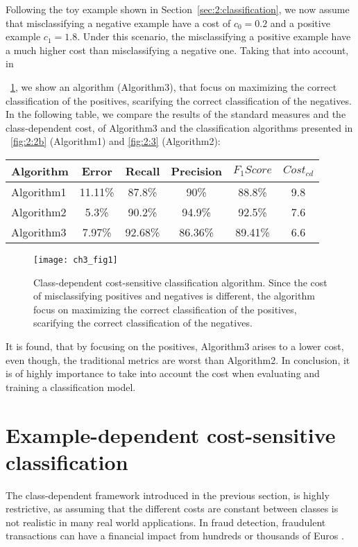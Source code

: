 Following the toy example shown in Section~\ref{sec:2:classification}, we now assume that 
misclassifying a negative example have a cost of $c_0=0.2$ and a positive example $c_1=1.8$. 
Under this scenario, the misclassifying a positive example have a much higher cost than 
misclassifying a negative one. Taking that into account, in \figurename{~\ref{fig:3:1}, we show an 
algorithm (Algorithm3), that focus on maximizing the correct classification of the positives, 
scarifying the correct classification of the negatives. In the following table, we compare the 
results of the standard measures and the class-dependent cost, of Algorithm3 and the classification 
algorithms presented in \figurename{~\ref{fig:2:2b}} (Algorithm1) and \figurename{ \ref{fig:2:3}} 
(Algorithm2):
\begin{center}
    \footnotesize
  \begin{tabular}{l|c|c|c|c|c}
  Algorithm & Error & Recall & Precision & $F_1Score$ & $Cost_{cd}$ \\
  \hline
  Algorithm1 & 11.11\% & 87.8\%& 90\%& 88.8\% & 9.8\\ %
  Algorithm2 & 5.3\% & 90.2\%& 94.9\%& 92.5\% & 7.6\\ %
  Algorithm3 & 7.97\%& 92.68\% &86.36\%& 89.41\% & 6.6 \\
  \end{tabular}
\end{center}

\begin{figure}[t!]
  \centering
  \texttt{[image: ch3\_fig1]}
  \caption{Class-dependent cost-sensitive classification algorithm. Since the cost of misclassifying 
positives and negatives is different, the algorithm focus on maximizing the correct classification 
of the positives, scarifying the correct classification of the negatives.}
  \label{fig:3:1}
\end{figure}

It is found, that by focusing on the positives, Algorithm3 arises to a lower cost, even though, the 
traditional metrics are worst than Algorithm2. In conclusion, it is of highly importance to take 
into account the cost when evaluating and training a classification model.


\section{Example-dependent cost-sensitive classification}

The class-dependent framework introduced in the previous section, is highly restrictive, as 
assuming that the different costs are constant between classes is not realistic in many real world 
applications. In fraud detection, fraudulent transactions  can have a financial impact from 
hundreds or thousands of Euros \cite{Sahin2013}.


}
